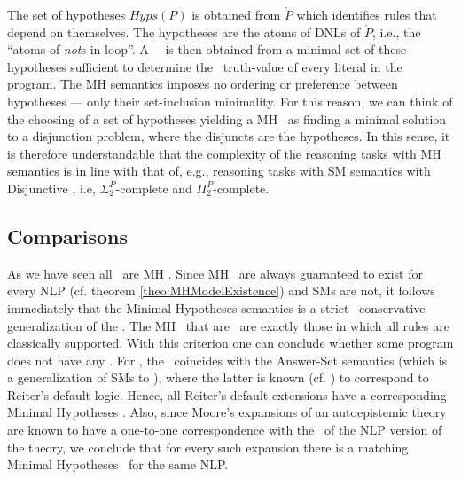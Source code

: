 \documentclass{llncs}
\begin{document}
		The set of hypotheses $Hyps(P)$ is obtained from $\mathring{P}$ which identifies rules that depend on themselves.
		The hypotheses are the atoms of DNLs of $\mathring{P}$, i.e., the ``atoms of \emph{not}s in loop''.
		A \MH\ \m\ is then obtained from a minimal set of these hypotheses sufficient to determine the \twov\ truth-value of every literal in the program.
		The MH semantics imposes no ordering or preference between hypotheses --- only their set-inclusion minimality.
		For this reason, we can think of the choosing of a set of hypotheses yielding a MH \m\ as finding a minimal solution to a disjunction problem, where the disjuncts are the hypotheses.
		In this sense, it is therefore understandable that the complexity of the reasoning tasks with MH semantics is in line with that of, e.g., reasoning tasks with SM semantics with Disjunctive \LPs, i.e, $\Sigma_2^P$-complete and $\Pi_2^P$-complete.



		
		\subsection{Comparisons}
			As we have seen all \sms\ are MH \ms.
			Since MH \ms\ are always guaranteed to exist for every NLP (cf. theorem \ref{theo:MHModelExistence}) and SMs are not, it follows
			immediately that the Minimal Hypotheses semantics is a strict \m\ conservative generalization of the \SMss.
			The MH \ms\ that are \sms\ are exactly those in which all rules are classically supported.
			With this criterion one can conclude whether some program does not have any \sms.
			For \NLPs, the \SMss\ coincides with the Answer-Set semantics (which is a generalization of SMs to \ELPs), where the latter is known 
			(cf. \cite{LPsWithCNeg}) to correspond to Reiter's default logic.
			Hence, all Reiter's default extensions have a corresponding Minimal Hypotheses \m.
			Also, since Moore's expansions of an autoepistemic theory \cite{2781} are known to have a one-to-one correspondence with the \sms\ of
			the NLP version of the theory, we conclude that for every such expansion there is a matching Minimal Hypotheses \m\ for the same NLP.
			
\end{document}
